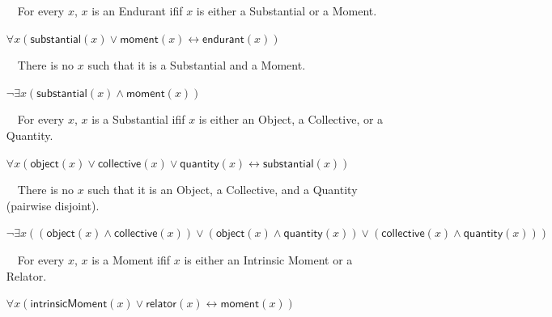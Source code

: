 \documentclass{article}
\newcommand{\AxLabel}{a}
\newcounter{cntax}
\newcommand{\myax}[1]{\refstepcounter{cntax}{\bf \small \AxLabel\thecntax}\label{#1}$\,\,\,\,$}
\newcommand{\me}[1]{\textsf{#1}}
\begin{document}
\begin{itemize}
    \item[\myax{ax_endurant_taxonomy}] For every $x$, $x$ is an \me{Endurant} ifif $x$ is either a \me{Substantial} or a \me{Moment}.
    
    $\forall x(\textsf{substantial}(x)\vee \textsf{moment}(x)\leftrightarrow \textsf{endurant}(x))$
    
    
    
    
    \item[\myax{ax_endurant_partition}] There is no $x$ such that it is a \me{Substantial} and a \me{Moment}.
    
    $\neg \exists x(\textsf{substantial}(x)\wedge \textsf{moment}(x))$
    
    
    
    \item[\myax{ax_substantial_taxonomy}] For every $x$, $x$ is a \me{Substantial} ifif $x$ is either an \me{Object}, a \me{Collective}, or a \me{Quantity}.
    
    $\forall x(\textsf{object}(x)\vee \textsf{collective}(x)\vee \textsf{quantity}(x)\leftrightarrow \textsf{substantial}(x))$
    
    
    
    
    \item[\myax{ax_substantial_partition}] There is no $x$ such that it is an \me{Object}, a \me{Collective}, and a \me{Quantity} (pairwise disjoint).
    
    $\neg \exists x((\textsf{object}(x)\wedge \textsf{collective}(x))\vee (\textsf{object}(x)\wedge \textsf{quantity}(x))\vee (\textsf{collective}(x)\wedge \textsf{quantity}(x)))$
    
    

    \item[\myax{ax_moment_taxonomy}] For every $x$, $x$ is a \me{Moment} ifif $x$ is either an \me{Intrinsic Moment} or a \me{Relator}.
    
    $\forall x(\textsf{intrinsicMoment}(x)\vee \textsf{relator}(x)\leftrightarrow \textsf{moment}(x))$
    
    
    

\end{itemize}
\end{document}
